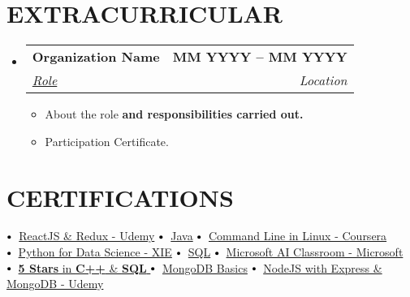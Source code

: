 \documentclass[letterpaper,11pt]{article}
\makeatletter
\newcommand{\resumeItem}[1]{
		\item\small{
						{#1 \vspace{-2pt}}
				}
		}
\newcommand{\resumeSubheading}[4]{
				\vspace{-2pt}\item
				\begin{tabular*}{1.0\textwidth}[t]{l@{\extracolsep{\fill}}r}
						\textbf{\large#1} & \textbf{\small #2} \\
						\textit{\large#3} & \textit{\small #4} \\

				\end{tabular*}\vspace{-7pt}
		}
\newcommand{\resumeSubHeadingListStart}{\begin{itemize}[leftmargin=0.0in, label={}]}
\newcommand{\resumeSubHeadingListEnd}{\end{itemize}}
\newcommand{\resumeItemListStart}{\begin{itemize}}
\newcommand{\resumeItemListEnd}{\end{itemize}\vspace{-5pt}}
\newcommand\sbullet[1][.5]{\mathbin{\vcenter{\hbox{\scalebox{#1}{$\bullet$}}}}}
\makeatother
\begin{document}
\section{EXTRACURRICULAR}
\resumeSubHeadingListStart
\resumeSubheading{Organization Name \href{Certificate Proof link}{\raisebox{-0.1\height}\faExternalLink } }{MM YYYY -- MM YYYY}{\underline{Role}}{Location}
\resumeItemListStart
\resumeItem{\normalsize{About the role \textbf{and responsibilities carried out.}}}
\resumeItem{\normalsize{Participation Certificate. \href{ParticipationCertificateLink.com}{\raisebox{-0.1\height}\faExternalLink }}}
\resumeItemListEnd
\resumeSubHeadingListEnd
\vspace{-11pt}

\section{CERTIFICATIONS}


$\sbullet[.75] \hspace{0.1cm}$ {\href{certificateLink.com}{ReactJS \& Redux - Udemy}} \hspace{1.6cm}
$\sbullet[.75] \hspace{0.1cm}$ {\href{certificateLink.com}{Java}} \hspace{2.59cm}
$\sbullet[.75] \hspace{0.2cm}${\href{certificateLink.com} {Command Line in Linux - Coursera}}\\


$\sbullet[.75] \hspace{0.2cm}${\href{certificateLink.com}{Python for Data Science - XIE}} \hspace{1cm}
$\sbullet[.75] \hspace{0.1cm}$ {\href{certificateLink.com}{SQL}} \hspace{2.6cm}
$\sbullet[.75] \hspace{0.2cm}${\href{certificateLink.com}{Microsoft AI Classroom - Microsoft}} \\


$\sbullet[.75] \hspace{0.2cm}${\href{certificateLink.com}{\textbf{5 Stars} in \textbf{C++} \& \textbf{SQL} \href{certificateLink.com}{\raisebox{-0.1\height}\faExternalLink }}}\hspace{1.45cm}
$\sbullet[.75] \hspace{0.2cm}${\href{certificateLink.com}{MongoDB Basics}} \hspace{0.5cm}
$\sbullet[.75] \hspace{0.2cm}${\href{certificateLink.com}{NodeJS with Express \& MongoDB - Udemy}} \\
\end{document}
